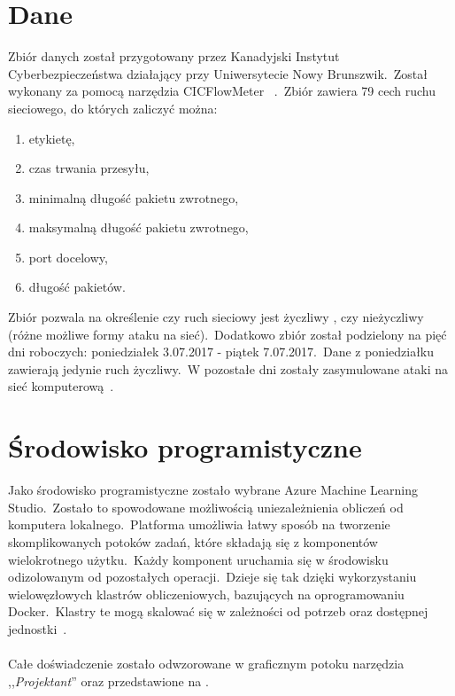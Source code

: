 \section{Dane}
Zbiór danych został przygotowany przez Kanadyjski Instytut Cyberbezpieczeństwa działający przy Uniwersytecie Nowy Brunszwik.\ Został wykonany za pomocą narzędzia CICFlowMeter
~\cite{Ahlashkari2022}.\ Zbiór zawiera 79 cech ruchu sieciowego, do których zaliczyć można:
\begin{enumerate}
    \item etykietę,
    \item czas trwania przesyłu,
    \item minimalną długość pakietu zwrotnego,
    \item maksymalną długość pakietu zwrotnego,
    \item port docelowy,
    \item długość pakietów.
\end{enumerate}
Zbiór pozwala na określenie czy ruch sieciowy jest życzliwy , czy nieżyczliwy (różne możliwe formy ataku na sieć).\ Dodatkowo zbiór został podzielony na pięć dni roboczych: poniedziałek 3.07.2017 - piątek 7.07.2017.\ Dane z poniedziałku zawierają jedynie ruch życzliwy.\ W pozostałe dni zostały zasymulowane ataki na sieć komputerową~\cite{Blyszcz2022, unbkaggle}.

\section{Środowisko programistyczne}
Jako środowisko programistyczne zostało wybrane Azure Machine Learning Studio.\ Zostało to spowodowane możliwością uniezależnienia obliczeń od komputera lokalnego.\ Platforma umożliwia łatwy sposób na tworzenie skomplikowanych potoków zadań, które składają się z komponentów wielokrotnego użytku.\ Każdy komponent uruchamia się w środowisku odizolowanym od pozostałych operacji.\ Dzieje się tak dzięki wykorzystaniu wielowęzłowych klastrów obliczeniowych, bazujących na oprogramowaniu Docker.\ Klastry te mogą skalować się w zależności od potrzeb oraz dostępnej jednostki~\cite{MicrosoftLearn2023}.
\\ \\
Całe doświadczenie zostało odwzorowane w graficznym potoku narzędzia ,,\textit{Projektant}'' oraz przedstawione na .

